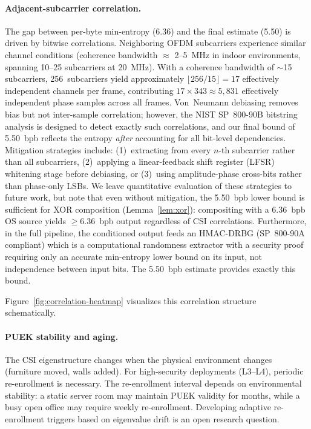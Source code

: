 \paragraph{Adjacent-subcarrier correlation.}
The gap between per-byte min-entropy (6.36) and the final estimate (5.50) is driven by bitwise correlations.
Neighboring OFDM subcarriers experience similar channel conditions (coherence bandwidth $\approx$ 2--5~MHz in indoor environments, spanning 10--25 subcarriers at 20~MHz).
With a coherence bandwidth of $\sim$15 subcarriers, 256~subcarriers yield approximately $\lfloor 256/15 \rfloor = 17$ effectively independent channels per frame, contributing $17 \times 343 \approx 5{,}831$ effectively independent phase samples across all frames.
Von~Neumann debiasing removes bias but not inter-sample correlation; however, the NIST SP~800-90B bitstring analysis is designed to detect exactly such correlations, and our final bound of 5.50~bpb reflects the entropy \emph{after} accounting for all bit-level dependencies.
Mitigation strategies include: (1)~extracting from every $n$-th subcarrier rather than all subcarriers, (2)~applying a linear-feedback shift register (LFSR) whitening stage before debiasing, or (3)~using amplitude-phase cross-bits rather than phase-only LSBs.
We leave quantitative evaluation of these strategies to future work, but note that even without mitigation, the 5.50~bpb lower bound is sufficient for XOR composition (Lemma~\ref{lem:xor}): compositing with a 6.36~bpb OS source yields $\geq$6.36~bpb output regardless of CSI correlations.
Furthermore, in the full \zipminator pipeline, the conditioned output feeds an HMAC-DRBG (SP~800-90A compliant) which is a computational randomness extractor with a security proof requiring only an accurate min-entropy lower bound on its input, not independence between input bits.
The 5.50~bpb estimate provides exactly this bound.

Figure~\ref{fig:correlation-heatmap} visualizes this correlation structure schematically.



\paragraph{PUEK stability and aging.}
The CSI eigenstructure changes when the physical environment changes (furniture moved, walls added).
For high-security deployments (L3--L4), periodic re-enrollment is necessary.
The re-enrollment interval depends on environmental stability: a static server room may maintain PUEK validity for months, while a busy open office may require weekly re-enrollment.
Developing adaptive re-enrollment triggers based on eigenvalue drift is an open research question.

